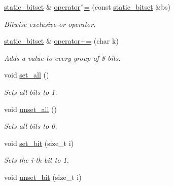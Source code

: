 \begin{DoxyCompactItemize}
\hyperlink{classlgraph_1_1utils_1_1static__bitset}{static\-\_\-bitset} \& \hyperlink{classlgraph_1_1utils_1_1static__bitset_a2f07c03e35d9a5661cf573ed1eb379a6}{operator$^\wedge$=} (const \hyperlink{classlgraph_1_1utils_1_1static__bitset}{static\-\_\-bitset} \&bs)
\begin{DoxyCompactList}\small\item\em Bitwise {\itshape exclusive-\/or} operator. \end{DoxyCompactList}\item 
\hyperlink{classlgraph_1_1utils_1_1static__bitset}{static\-\_\-bitset} \& \hyperlink{classlgraph_1_1utils_1_1static__bitset_a2c595a4b2c3ab2bbd72c1dad0504cc38}{operator+=} (char k)
\begin{DoxyCompactList}\small\item\em Adds a value to every group of 8 bits. \end{DoxyCompactList}\item 
\hypertarget{classlgraph_1_1utils_1_1static__bitset_a95f2e92b2b44f7e84e0131a7bf04402d}{void \hyperlink{classlgraph_1_1utils_1_1static__bitset_a95f2e92b2b44f7e84e0131a7bf04402d}{set\-\_\-all} ()}\label{classlgraph_1_1utils_1_1static__bitset_a95f2e92b2b44f7e84e0131a7bf04402d}

\begin{DoxyCompactList}\small\item\em Sets all bits to 1. \end{DoxyCompactList}\item 
\hypertarget{classlgraph_1_1utils_1_1static__bitset_a38f34197224e168f40b5370c23c4243d}{void \hyperlink{classlgraph_1_1utils_1_1static__bitset_a38f34197224e168f40b5370c23c4243d}{unset\-\_\-all} ()}\label{classlgraph_1_1utils_1_1static__bitset_a38f34197224e168f40b5370c23c4243d}

\begin{DoxyCompactList}\small\item\em Sets all bits to 0. \end{DoxyCompactList}\item 
\hypertarget{classlgraph_1_1utils_1_1static__bitset_ac78088fe22921e615bbe49f05c4d794a}{void \hyperlink{classlgraph_1_1utils_1_1static__bitset_ac78088fe22921e615bbe49f05c4d794a}{set\-\_\-bit} (size\-\_\-t i)}\label{classlgraph_1_1utils_1_1static__bitset_ac78088fe22921e615bbe49f05c4d794a}

\begin{DoxyCompactList}\small\item\em Sets the {\itshape i-\/th} bit to 1. \end{DoxyCompactList}\item 
\hypertarget{classlgraph_1_1utils_1_1static__bitset_af5f2d8f8f9d244e8f4768678ed8a7077}{void \hyperlink{classlgraph_1_1utils_1_1static__bitset_af5f2d8f8f9d244e8f4768678ed8a7077}{unset\-\_\-bit} (size\-\_\-t i)}\label{classlgraph_1_1utils_1_1static__bitset_af5f2d8f8f9d244e8f4768678ed8a7077}


\end{DoxyCompactItemize}
